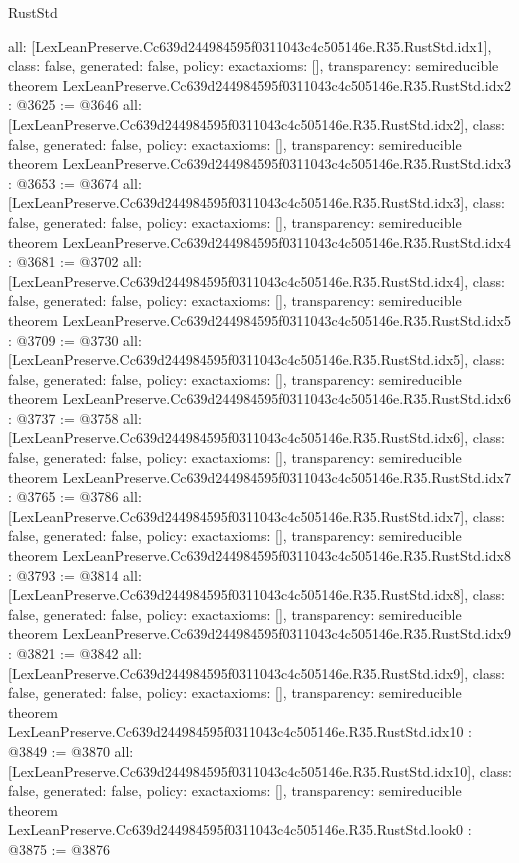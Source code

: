 \begin{lexlean}{RustStd}
\begin{coremodule}
{  all: [LexLeanPreserve.Cc639d244984595f0311043c4c505146e.R35.RustStd.idx1],
  class: false,
  generated: false,
  policy: exact{axioms: []},
  transparency: semireducible
}
theorem LexLeanPreserve.Cc639d244984595f0311043c4c505146e.R35.RustStd.idx2 : @3625 := @3646 {
  all: [LexLeanPreserve.Cc639d244984595f0311043c4c505146e.R35.RustStd.idx2],
  class: false,
  generated: false,
  policy: exact{axioms: []},
  transparency: semireducible
}
theorem LexLeanPreserve.Cc639d244984595f0311043c4c505146e.R35.RustStd.idx3 : @3653 := @3674 {
  all: [LexLeanPreserve.Cc639d244984595f0311043c4c505146e.R35.RustStd.idx3],
  class: false,
  generated: false,
  policy: exact{axioms: []},
  transparency: semireducible
}
theorem LexLeanPreserve.Cc639d244984595f0311043c4c505146e.R35.RustStd.idx4 : @3681 := @3702 {
  all: [LexLeanPreserve.Cc639d244984595f0311043c4c505146e.R35.RustStd.idx4],
  class: false,
  generated: false,
  policy: exact{axioms: []},
  transparency: semireducible
}
theorem LexLeanPreserve.Cc639d244984595f0311043c4c505146e.R35.RustStd.idx5 : @3709 := @3730 {
  all: [LexLeanPreserve.Cc639d244984595f0311043c4c505146e.R35.RustStd.idx5],
  class: false,
  generated: false,
  policy: exact{axioms: []},
  transparency: semireducible
}
theorem LexLeanPreserve.Cc639d244984595f0311043c4c505146e.R35.RustStd.idx6 : @3737 := @3758 {
  all: [LexLeanPreserve.Cc639d244984595f0311043c4c505146e.R35.RustStd.idx6],
  class: false,
  generated: false,
  policy: exact{axioms: []},
  transparency: semireducible
}
theorem LexLeanPreserve.Cc639d244984595f0311043c4c505146e.R35.RustStd.idx7 : @3765 := @3786 {
  all: [LexLeanPreserve.Cc639d244984595f0311043c4c505146e.R35.RustStd.idx7],
  class: false,
  generated: false,
  policy: exact{axioms: []},
  transparency: semireducible
}
theorem LexLeanPreserve.Cc639d244984595f0311043c4c505146e.R35.RustStd.idx8 : @3793 := @3814 {
  all: [LexLeanPreserve.Cc639d244984595f0311043c4c505146e.R35.RustStd.idx8],
  class: false,
  generated: false,
  policy: exact{axioms: []},
  transparency: semireducible
}
theorem LexLeanPreserve.Cc639d244984595f0311043c4c505146e.R35.RustStd.idx9 : @3821 := @3842 {
  all: [LexLeanPreserve.Cc639d244984595f0311043c4c505146e.R35.RustStd.idx9],
  class: false,
  generated: false,
  policy: exact{axioms: []},
  transparency: semireducible
}
theorem LexLeanPreserve.Cc639d244984595f0311043c4c505146e.R35.RustStd.idx10 : @3849 := @3870 {
  all: [LexLeanPreserve.Cc639d244984595f0311043c4c505146e.R35.RustStd.idx10],
  class: false,
  generated: false,
  policy: exact{axioms: []},
  transparency: semireducible
}
theorem LexLeanPreserve.Cc639d244984595f0311043c4c505146e.R35.RustStd.look0 : @3875 := @3876 {
}
\end{coremodule}
\end{lexlean}
